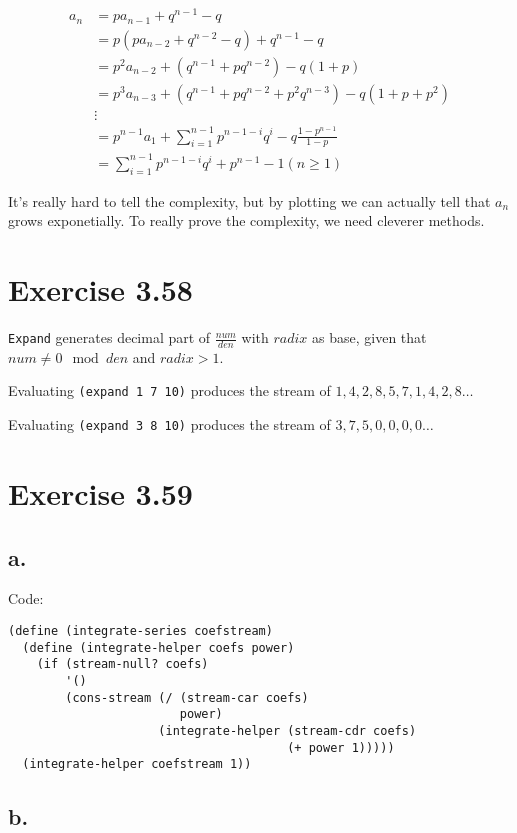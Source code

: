 \documentclass[../main.tex]{subfiles}
\begin{document}
\begin{align*}
a_n &= pa_{n-1} + q^{n-1} - q\\
&= p(pa_{n-2} + q^{n-2} - q) + q^{n-1} - q\\
&= p^2a_{n-2} + (q^{n-1} + pq^{n-2}) - q(1 + p)\\
&= p^3a_{n-3} + (q^{n-1} + pq^{n-2} + p^2q^{n-3}) - q(1 + p + p^2)\\
&\vdots\\
&= p^{n-1}a_1 + \sum_{i=1}^{n-1}p^{n-1-i}q^i - q\frac{1-p^{n-1}}{1-p}\\
&= \sum_{i=1}^{n-1}p^{n-1-i}q^i + p^{n-1} - 1 (n \ge 1)
\end{align*}

It's really hard to tell the complexity, but by plotting we can actually tell that $a_n$ grows exponetially. To really prove the complexity, we need cleverer methods.

\section{Exercise 3.58}

\lstinline{Expand} generates decimal part of $\frac{num}{den}$ with $radix$ as base, given that $num \neq 0 \mod den$ and $radix > 1$.

Evaluating \lstinline{(expand 1 7 10)} produces the stream of $1, 4, 2, 8, 5, 7, 1, 4, 2, 8 \dots$

Evaluating \lstinline{(expand 3 8 10)} produces the stream of $3, 7, 5, 0, 0, 0, 0 \dots$

\section{Exercise 3.59}

\subsection{a.}

Code:

\begin{lstlisting}
(define (integrate-series coefstream)
  (define (integrate-helper coefs power)
    (if (stream-null? coefs)
        '()
        (cons-stream (/ (stream-car coefs)
                        power)
                     (integrate-helper (stream-cdr coefs)
                                       (+ power 1)))))
  (integrate-helper coefstream 1))
\end{lstlisting}

\subsection{b.}
\end{document}
